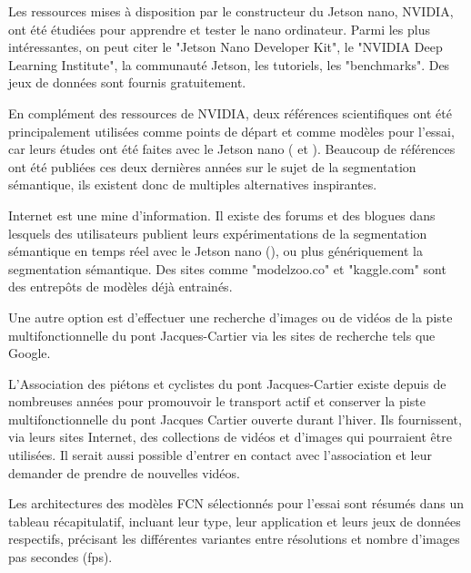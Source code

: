 ﻿\par Les ressources mises à disposition par le constructeur du Jetson nano, NVIDIA, ont été étudiées pour apprendre et tester le nano ordinateur. Parmi les plus intéressantes, on peut citer le "Jetson Nano Developer Kit", le "NVIDIA Deep Learning Institute", la communauté Jetson, les tutoriels, les "benchmarks". Des jeux de données sont fournis gratuitement.
\par En complément des ressources de NVIDIA, deux références scientifiques ont été principalement utilisées comme points de départ et comme modèles pour l'essai, car leurs études ont été faites avec le Jetson nano (\cite{nguyen_mavnet_2019} et \cite{chong_real-time_1992}). Beaucoup de références ont été publiées ces deux dernières années sur le sujet de la segmentation sémantique, ils existent donc de multiples alternatives inspirantes.
\par Internet est une mine d'information. Il existe des forums et des blogues dans lesquels des utilisateurs publient leurs expérimentations de la segmentation sémantique en temps réel avec le Jetson nano (\cite{dustin_realtime_2019}), ou plus génériquement la segmentation sémantique. Des sites comme "modelzoo.co" et "kaggle.com" sont des entrepôts de modèles déjà entrainés. 
\par Une autre option est d'effectuer une recherche d'images ou de vidéos de la piste multifonctionnelle du pont Jacques-Cartier via les sites de recherche tels que Google. 
\par L'Association des piétons et cyclistes du pont Jacques-Cartier existe depuis de nombreuses années pour promouvoir le transport actif et conserver la piste multifonctionnelle du pont Jacques Cartier ouverte durant l'hiver. Ils fournissent, via leurs sites Internet, des collections de vidéos et d'images qui pourraient être utilisées. Il serait aussi possible d'entrer en contact avec l'association et leur demander de prendre de nouvelles vidéos. \cite{association_des_pietons_et_cyclistes_du_pont_jacques-cartier_pontjacques-cartier365com_2020} \cite{association_des_pietons_et_cyclistes_pont_jacques-cartier_flickr_2020}
\par Les architectures des modèles FCN sélectionnés pour l'essai sont résumés dans un tableau récapitulatif, incluant leur type, leur application et leurs jeux de données respectifs, précisant les différentes variantes entre résolutions et nombre d'images pas secondes (\acrshort{fps}).